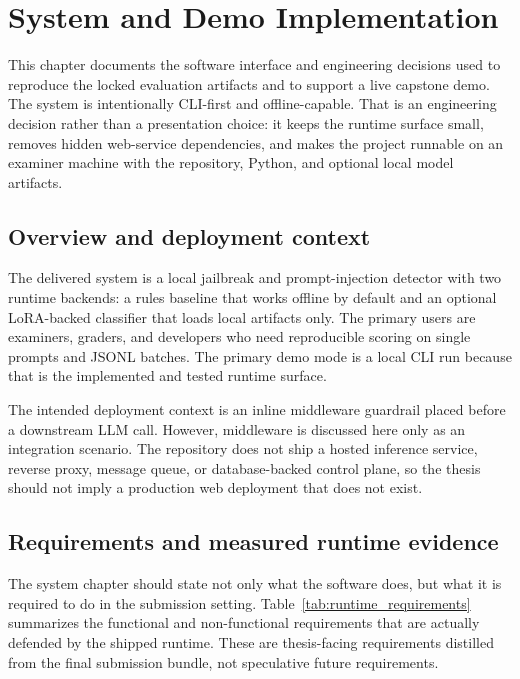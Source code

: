 \chapter{System and Demo Implementation}
\label{ch:system_demo}

This chapter documents the software interface and engineering decisions used to reproduce the locked evaluation artifacts and to support a live capstone demo. The system is intentionally CLI-first and offline-capable. That is an engineering decision rather than a presentation choice: it keeps the runtime surface small, removes hidden web-service dependencies, and makes the project runnable on an examiner machine with the repository, Python, and optional local model artifacts.

\section{Overview and deployment context}

The delivered system is a local jailbreak and prompt-injection detector with two runtime backends: a rules baseline that works offline by default and an optional LoRA-backed classifier that loads local artifacts only. The primary users are examiners, graders, and developers who need reproducible scoring on single prompts and JSONL batches. The primary demo mode is a local CLI run because that is the implemented and tested runtime surface.

The intended deployment context is an inline middleware guardrail placed before a downstream LLM call. However, middleware is discussed here only as an integration scenario. The repository does not ship a hosted inference service, reverse proxy, message queue, or database-backed control plane, so the thesis should not imply a production web deployment that does not exist.

\section{Requirements and measured runtime evidence}

The system chapter should state not only what the software does, but what it is required to do in the submission setting. Table~\ref{tab:runtime_requirements} summarizes the functional and non-functional requirements that are actually defended by the shipped runtime. These are thesis-facing requirements distilled from the final submission bundle, not speculative future requirements.

